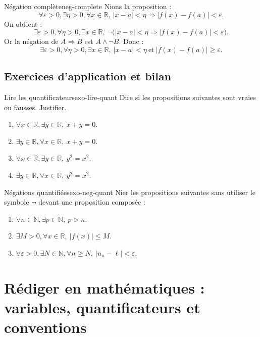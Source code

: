 \documentclass[11pt,a4paper]{article}
\newcommand{\R}{\mathbb{R}}
\newcommand{\N}{\mathbb{N}}
\begin{document}
\begin{exemplebox}{Négation complète}{neg-complete}
Nions la proposition :
\[
\forall \varepsilon>0,\exists \eta>0,\forall x\in\R,\ |x-a|<\eta\Rightarrow |f(x)-f(a)|<\varepsilon.
\]
On obtient :
\[
\exists \varepsilon>0,\forall \eta>0,\exists x\in\R,\ \neg\big(|x-a|<\eta\Rightarrow |f(x)-f(a)|<\varepsilon\big).
\]
Or la négation de $A\Rightarrow B$ est $A\land\neg B$. Donc :
\[
\exists \varepsilon>0,\forall \eta>0,\exists x\in\R,\ |x-a|<\eta\ \text{et}\ |f(x)-f(a)|\geq \varepsilon.
\]
\end{exemplebox}

\subsection{Exercices d'application et bilan}

\begin{exercicebox}{Lire les quantificateurs}{exo-lire-quant}
Dire si les propositions suivantes sont vraies ou fausses. Justifier.
\begin{enumerate}
  \item $\forall x\in\R,\exists y\in\R,\ x+y=0$.
  \item $\exists y\in\R,\forall x\in\R,\ x+y=0$.
  \item $\forall x\in\R,\exists y\in\R,\ y^2=x^2$.
  \item $\exists y\in\R,\forall x\in\R,\ y^2=x^2$.
\end{enumerate}
\end{exercicebox}

\begin{exercicebox}{Négations quantifiées}{exo-neg-quant}
Nier les propositions suivantes sans utiliser le symbole $\neg$ devant une proposition composée :
\begin{enumerate}
  \item $\forall n\in\N,\exists p\in\N,\ p>n$.
  \item $\exists M>0,\forall x\in\R,\ |f(x)|\leq M$.
  \item $\forall \varepsilon>0,\exists N\in\N,\forall n\geq N,\ |u_n-\ell|<\varepsilon$.
\end{enumerate}
\end{exercicebox}


\section{Rédiger en mathématiques : variables, quantificateurs et conventions}
\end{document}
